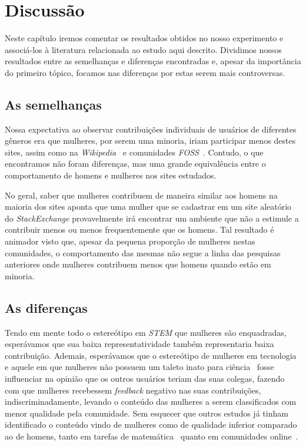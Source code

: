 \chapter{Discussão}
\label{ch:discussao}

Neste capítulo iremos comentar os resultados obtidos no nosso experimento e associá-los à literatura relacionada ao estudo aqui descrito. Dividimos nossos resultados entre as semelhanças e diferenças encontradas e, apesar da importância do primeiro tópico, focamos nas diferenças por estas serem mais controversas.

\section{As semelhanças}

Nossa expectativa ao observar contribuições individuais de usuários de diferentes gêneros era que mulheres, por serem uma minoria, iriam participar menos destes sites, assim como na \emph{Wikipedia}~\cite{antin2011gender} e comunidades \emph{FOSS}~\cite{rustad2011suck}. Contudo, o que encontramos não foram diferenças, mas uma grande equivalência entre o comportamento de homens e mulheres nos sites estudados. 

No geral, saber que mulheres contribuem de maneira similar aos homens na maioria dos sites aponta que uma mulher que se cadastrar em um site aleatório do \emph{StackExchange} provavelmente irá encontrar um ambiente que não a estimule a contribuir menos ou menos frequentemente que os homens. Tal resultado é animador visto que, apesar da pequena proporção de mulheres nestas comunidades, o comportamento das mesmas não segue a linha das pesquisas anteriores onde mulheres contribuem menos que homens quando estão em minoria.

\section{As diferenças}

Tendo em mente todo o estereótipo em \emph{STEM} que mulheres são enquadradas, esperávamos que sua baixa representatividade também representaria baixa contribuição. Ademais, esperávamos que o estereótipo de mulheres em tecnologia~\cite{hyde1990gender} e aquele em que mulheres não possuem um taleto inato para ciência~\cite{leslie2015expectations} fosse influenciar na opinião que os outros usuários teriam das suas colegas, fazendo com que mulheres recebessem \emph{feedback} negativo nas suas contribuições, indiscriminadamente, levando o conteúdo das mulheres a serem classificados com menor qualidade pela comunidade. Sem esquecer que outros estudos já tinham identificado o conteúdo vindo de mulheres como de qualidade inferior comparado ao de homens, tanto em tarefas de matemática~\cite{campbell1986effects} quanto em comunidades online~\cite{collier2012conflict}.

